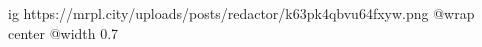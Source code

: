  
 
 
 
 

\ifcmt
  ig https://mrpl.city/uploads/posts/redactor/k63pk4qbvu64fxyw.png
  @wrap center
  @width 0.7
\fi
